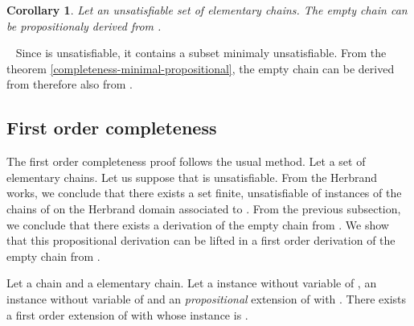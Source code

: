 \documentclass{article}
\newtheorem{corollaire}[theoreme]{Corollary}
\newenvironment{preuve}{\noindent {\em Proof :}\ }{{\hfill
    }\vspace{.5pc}} \newcommand{\sg}{\!\!<\!\!}
\begin{document}
\begin{corollaire}\label{completeness-propositional}
Let  an unsatisfiable set of elementary chains. The empty chain can be propositionaly derived from .
\end{corollaire}

\begin{preuve}
Since  is unsatisfiable, it contains a subset  minimaly unsatisfiable. 
From the theorem \ref{completeness-minimal-propositional}, the empty chain can be derived from  therefore also
from .
\end{preuve}





\subsection{First order completeness}

The first order completeness proof follows the usual method. Let  a set of elementary chains.
Let us suppose that  is unsatisfiable. From the Herbrand works, we conclude   
that there exists a set  finite, unsatisfiable of instances  of the chains of  on the Herbrand domain
associated to . From the previous subsection, we conclude that there exists a derivation of the empty chain 
from . We show that this propositional derivation can be lifted in a first order derivation of the empty chain from 
.

\begin{lemme}\label{lifting-extension}
Let  a chain and  a elementary chain. Let  a instance without variable of ,  an instance without variable
of  and  an \emph{propositional} extension of  with . There exists a first order extension  of  with 
whose instance is .
\end{lemme}
\end{document}
